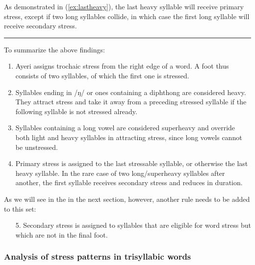 As demonstrated in (\ref{ex:lastheavy}), the last heavy syllable will receive 
primary stress, except if two long syllables collide, in which case the first 
long syllable will receive secondary stress.

\plainbreak{1}

To summarize the above findings:

\begin{enumerate}\label{2sylsumm}
\item Ayeri assigns trochaic stress from the right edge of a word. A foot 
	thus consists of two syllables, of which the first one is stressed.
\item Syllables ending in /ŋ/ or ones containing a diphthong are considered 
	heavy. They attract stress and take it away from a preceding stressed 
	syllable if the following syllable is not stressed already.
\item Syllables containing a long vowel are considered superheavy and override 
	both light and heavy syllables in attracting stress, since long vowels 
	cannot be unstressed.
\item Primary stress is assigned to the last stressable syllable, or otherwise 
	the last heavy syllable. In the rare case of two long/superheavy
	syllables after another, the first syllable receives secondary stress 
	and reduces in duration.
\end{enumerate}

\noindent As we will see in the in the next section, however, another rule
needs to be added to this set:

\begin{enumerate}
\item[5.] Secondary stress is assigned to syllables that are eligible for word 
	stress but which are not in the final foot.
\end{enumerate}

\subsubsection{Analysis of stress patterns in trisyllabic words}

